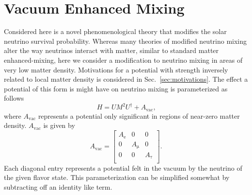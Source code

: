 \chapter{Vacuum Enhanced Mixing}
\label{sec:chameleons}

\ifpdf
    \graphicspath{{chameleons}{chameleons/figures/PDF/}{chameleons/figures/}}
\else
    \graphicspath{{chameleons/figures/EPS/}{chameleons/figures/}}
\fi

Considered here is a novel phenomenological theory that modifies the solar
neutrino survival probability.
Whereas many theories of modified neutrino mixing alter the way neutrinos
interact with matter, similar to standard matter enhanced-mixing,
here we consider a modification to neutrino mixing in areas of very low matter
density.
 Motivations for a potential with strength inversely related to local matter
density is considered in Sec.~\ref{sec:motivations}.
The effect a potential of this form is might have on neutrino
mixing is parameterized as follows
\begin{equation}
H = UM^{2}U^{\dagger} + A_{\mathrm{vac}}\text{,}
\end{equation}
where $A_{\mathrm{vac}}$ represents a potential only significant in regions
of near-zero matter density.
$A_{\mathrm{vac}}$ is given by
\begin{equation}
A_{\mathrm{vac}} =
\begin{bmatrix}
    A_{\mathrm{e}} & 0 & 0  \\
    0 &  A_{\mathrm{\mu}} & 0  \\
    0 & 0 &  A_{\mathrm{\tau}}  \\
\end{bmatrix}\text{.}
\end{equation}
Each diagonal entry represents a potential felt in the vacuum
by the neutrino of the given flavor state.
This parameterization can be simplified somewhat by subtracting off
an identity like term.
